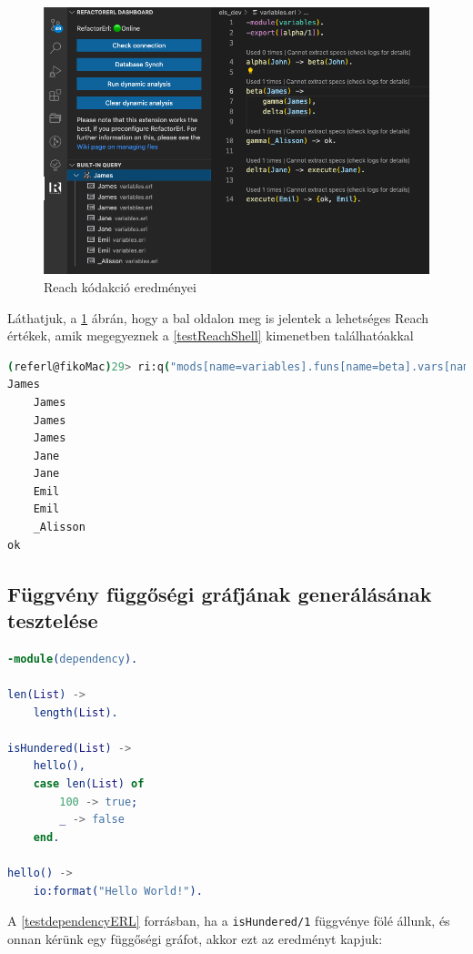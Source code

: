 \begin{figure}[H]
  \centering
  \includegraphics[width=0.8\linewidth]{images/testCases/testVarReach.png}
  \caption{Reach kódakció eredményei}
  \label{fig:testVarReach}
\end{figure}


Láthatjuk, a \ref{fig:testVarReach} ábrán, hogy a bal oldalon meg is jelentek a lehetséges Reach értékek, amik megegyeznek a \ref{testReachShell} kimenetben találhatóakkal


\lstset{caption=Válltozó Origin értéke Shellből, label=testReachShell}
\begin{lstlisting}[language={sh}]  
(referl@fikoMac)29> ri:q("mods[name=variables].funs[name=beta].vars[name=James].bindings.reach"). 
James
    James
    James
    James
    Jane
    Jane
    Emil
    Emil
    _Alisson
ok
\end{lstlisting}


\subsection{Függvény függőségi gráfjának generálásának tesztelése}

\begin{lstlisting}[language={erlang}]  
-module(dependency).

len(List) ->
    length(List).

isHundered(List) ->
    hello(),
    case len(List) of
        100 -> true;
        _ -> false
    end.

hello() ->
    io:format("Hello World!").
\end{lstlisting}

A \ref{testdependencyERL} forrásban, ha a \lstinline{isHundered/1} függvénye fölé állunk, és onnan kérünk egy függőségi gráfot, akkor ezt az eredményt kapjuk:

